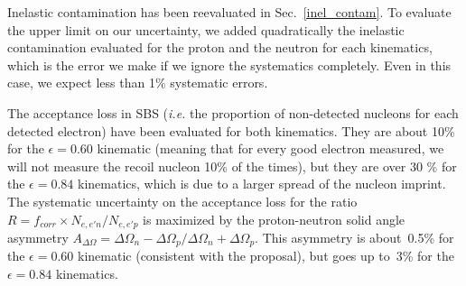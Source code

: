 Inelastic contamination has been reevaluated in Sec.~\ref{inel_contam}. To evaluate the upper limit on our uncertainty, we added quadratically the inelastic contamination evaluated for the proton and the neutron for each kinematics, which is the error we make if we ignore the systematics completely. Even in this case, we expect less than 1\% systematic errors.

The acceptance loss in SBS ({\it i.e.} the proportion of non-detected nucleons for each detected electron) have been evaluated for both kinematics.
They are about 10\% for the $\epsilon = 0.60$ kinematic (meaning that for every good electron measured, we will not measure the recoil nucleon 10\% of the times), but they are over 30 \% for the $\epsilon= 0.84$ kinematics, which is due to a larger spread of the nucleon imprint.
The systematic uncertainty on the acceptance loss for the ratio $R = f_{corr} \times N_{e,e'n}/N_{e,e'p}$ is maximized by the proton-neutron solid angle asymmetry $A_{\Delta\Omega} = {\Delta\Omega_n-\Delta\Omega_p}/{\Delta\Omega_n+\Delta\Omega_p}$.
This asymmetry is about~0.5\% for the $\epsilon = 0.60$ kinematic (consistent with the \gmn proposal), but goes up to~3\% for the $\epsilon= 0.84$ kinematics.





